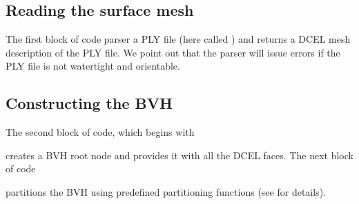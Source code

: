 \documentclass[letterpaper,10pt,english]{sphinxmanual}
\begin{document}
\subsection{Reading the surface mesh}
\label{\detokenize{Example_Basic:reading-the-surface-mesh}}
\sphinxAtStartPar
The first block of code parser a PLY file (here called ) and returns a DCEL mesh description of the PLY file.
We point out that the parser will issue errors if the PLY file is not watertight and orientable.


\subsection{Constructing the BVH}
\label{\detokenize{Example_Basic:constructing-the-bvh}}
\sphinxAtStartPar
The second block of code, which begins with

\begin{sphinxVerbatim}[commandchars=\\\{\}]
\end{sphinxVerbatim}

\sphinxAtStartPar
creates a BVH root node and provides it with all the DCEL faces.
The next block of code

\begin{sphinxVerbatim}[commandchars=\\\{\}]
    
        
\end{sphinxVerbatim}

\sphinxAtStartPar
partitions the BVH using pre\sphinxhyphen{}defined partitioning functions (see {\hyperref[\detokenize{ImplemDCEL:chap-bvhintegration}]{}} for details).
\end{document}

